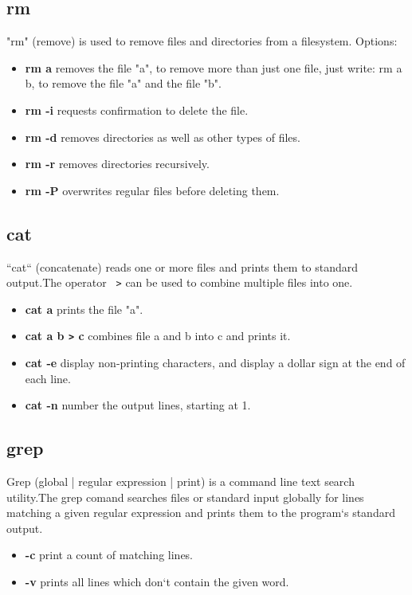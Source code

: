 \documentclass[10pt,a4paper]{scrartcl}
\begin{document}
\begin{description}
\subsection{rm}
"rm" (remove) is used to remove files and directories from a filesystem. Options:
\begin{doublespacing}
\begin{itemize}
\item{\bf{rm a}} \qquad removes the file "a", to remove more than just one file, just write: rm a b, to remove the file "a" and the file "b".
\item{\bf{rm -i}} \qquad requests confirmation to delete the file.
\item{\bf{rm -d}} \qquad  removes directories as well as other types of
                 files.
\item{\bf{rm -r}} \qquad removes directories recursively.
\item{\bf{rm -P}} \qquad overwrites regular files before deleting them. 
\end{itemize}
\end{doublespacing}

\subsection{cat}
“cat“ (concatenate) reads one or more files and prints them to standard output.The operator \verb$ >$ can be used to combine multiple files into one.
\begin{doublespacing}
\begin{itemize}
\item{\bf{cat a}} \qquad prints the file "a".
\item{\bf{cat a b \verb$>$ c}} \qquad combines file a and b into c and prints it.
\item{\bf{cat -e}} \qquad display non-printing characters, and display
             a dollar sign at the end of each line.
\item{\bf{cat -n}} \qquad number the output lines, starting at 1.
\end{itemize}
\end{doublespacing}
\begin{singlespacing}

\subsection{grep}
Grep (global | regular expression | print) is a command line text search utility.The grep comand searches files or standard input globally for lines matching a given regular expression and prints them to the program`s standard output.
\end{singlespacing}
\begin{doublespacing}
\begin{itemize}
\item{\bf{-c}} \qquad print a count of matching lines.
\item{\bf{-v}} \qquad prints all lines which don`t contain the given word.
\end{itemize}
\end{doublespacing}


\end{description}
\end{document}
